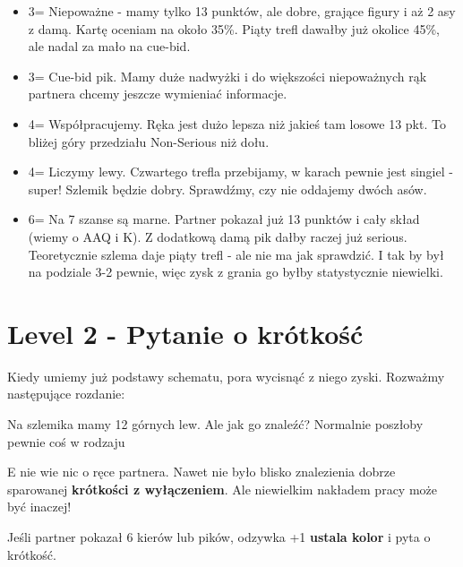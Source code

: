 \documentclass[12pt, a4paper]{article}
\begin{document}
\begin{itemize}
	\item 3\spades = Niepoważne - mamy tylko 13 punktów, ale dobre, grające figury i aż 2 asy z damą. Kartę oceniam na około 35\%. Piąty trefl dawałby już okolice 45\%, ale nadal za mało na cue-bid.
	\item 3\nt = Cue-bid pik. Mamy duże nadwyżki i do większości niepoważnych rąk partnera chcemy jeszcze wymieniać informacje.
	\item 4\clubs = Współpracujemy. Ręka jest dużo lepsza niż jakieś tam losowe 13 pkt. To bliżej góry przedziału Non-Serious niż dołu.
	\item 4\nt = Liczymy lewy. Czwartego trefla przebijamy, w karach pewnie jest singiel - super! Szlemik będzie dobry. Sprawdźmy, czy nie oddajemy dwóch asów.
	\item 6\hearts = Na 7 szanse są marne. Partner pokazał już 13 punktów i cały skład (wiemy o AAQ i \xclubs K). Z dodatkową damą pik dałby raczej już serious. Teoretycznie szlema daje piąty trefl - ale nie ma jak sprawdzić. I tak by był na podziale 3-2 pewnie, więc zysk z grania go byłby statystycznie niewielki.
\end{itemize}


\vspace{2cm}
\section*{Level 2 - Pytanie o krótkość}

Kiedy umiemy już podstawy schematu, pora wycisnąć z niego zyski. Rozważmy następujące rozdanie:

\vspace*{-1cm}

Na szlemika mamy 12 górnych lew. Ale jak go znaleźć? Normalnie poszłoby pewnie coś w rodzaju

\begin{center}
	\webidding{
		1\hearts & 2\clubs \\
		2\hearts & 2\nt \\
		3\hearts & 4\hearts
	}
\end{center}

E nie wie nic o ręce partnera. Nawet nie było blisko znalezienia dobrze sparowanej \textbf{krótkości z wyłączeniem}. Ale niewielkim nakładem pracy może być inaczej!

Jeśli partner pokazał 6 kierów lub pików, odzywka +1 \textbf{ustala kolor} i pyta o krótkość.
\end{document}
